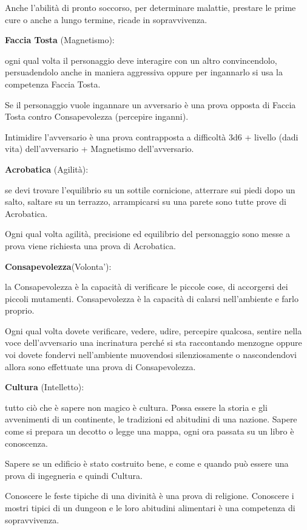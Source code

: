 \documentclass[a4paper,11pt,twoside,openany]{book}
\begin{document}
Anche l'abilità di pronto soccorso, per determinare malattie, prestare le prime cure o anche a lungo termine, ricade in sopravvivenza.

\textbf{Faccia Tosta} (Magnetismo):

ogni qual volta il personaggio deve interagire con un altro convincendolo, persuadendolo anche in maniera aggressiva oppure per ingannarlo si usa la competenza Faccia Tosta.

Se il personaggio vuole ingannare un avversario è una prova opposta di Faccia Tosta contro Consapevolezza (percepire inganni).

Intimidire l'avversario è una prova contrapposta a difficoltà 3d6 + livello (dadi vita) dell'avversario + Magnetismo dell'avversario.

\textbf{Acrobatica} (Agilità):

se devi trovare l'equilibrio su un sottile cornicione, atterrare sui piedi dopo un salto, saltare su un terrazzo, arrampicarsi su una parete sono tutte prove di Acrobatica.

Ogni qual volta agilità, precisione ed equilibrio del personaggio sono messe a prova viene richiesta una prova di Acrobatica.

\textbf{Consapevolezza}(Volonta'):

la Consapevolezza è la capacità di verificare le piccole cose, di accorgersi dei piccoli mutamenti. Consapevolezza è la capacità di calarsi nell'ambiente e farlo proprio.

Ogni qual volta dovete verificare, vedere, udire, percepire qualcosa, sentire nella voce dell'avversario una incrinatura perché si sta raccontando menzogne oppure voi dovete fondervi nell'ambiente muovendosi silenziosamente o nascondendovi allora sono effettuate una prova di Consapevolezza.

\textbf{Cultura} (Intelletto):

tutto ciò che è sapere non magico è cultura. Possa essere la storia e gli avvenimenti di un continente, le tradizioni ed abitudini di una nazione. Sapere come si prepara un decotto o legge una mappa, ogni ora passata su un libro è conoscenza.

Sapere se un edificio è stato costruito bene, e come e quando può essere una prova di ingegneria e quindi Cultura.

Conoscere le feste tipiche di una divinità è una prova di religione. Conoscere i mostri tipici di un dungeon e le loro abitudini alimentari è una competenza di sopravvivenza.
\end{document}
